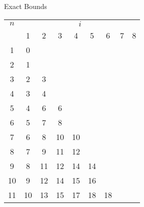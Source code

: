 \begin{frame}{Exact Bounds} %
  \vspace{-1cm}
  \begin{table}[!t]
    \label{tab:results}
    \centering
    \small
    \begin{tabular}{c|cccccccc}
      $n$ & \multicolumn{8}{c}{$i$}                                                                                                      \\
          & 1                       & 2  & 3           & 4           & 5           & 6           & 7                 & 8                 \\ \hline
      1   & 0                                                                                                                            \\
      2   & 1                                                                                                                            \\
      3   & 2                       & 3                                                                                                  \\
      4   & 3                       & 4                                                                                                  \\
      5   & 4                       & 6  & 6                                                                                             \\
      6   & 5                       & 7  & 8                                                                                             \\
      7   & 6                       & 8  & 10          & 10                                                                              \\
      8   & 7                       & 9  & 11          & 12                                                                              \\
      9   & 8                       & 11 & 12          & 14          & 14                                                                \\
      10  & 9                       & 12 & 14          & 15          & 16                                                                \\
      11  & 10                      & 13 & 15          & 17          & 18          & 18                                                  \\

\end{tabular}
\end{table}
\end{frame}
